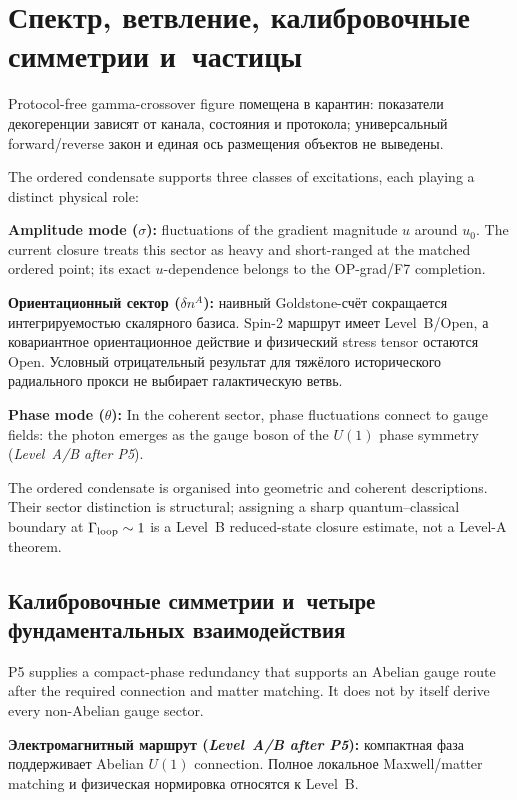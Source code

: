 \documentclass[11pt,a4paper]{article}
\begin{document}
\section{Спектр, ветвление, калибровочные симметрии и~частицы}
\label{sec:pop_spectrum_etc}

Protocol-free gamma-crossover figure помещена в карантин: показатели декогеренции зависят от канала, состояния и протокола; универсальный forward/reverse закон и единая ось размещения объектов не выведены.

The ordered condensate supports three classes of excitations, each playing a distinct physical role:

\textbf{Amplitude mode ($\sigma$):} fluctuations of the gradient magnitude $u$ around $u_0$.  The current closure treats this sector as heavy and short-ranged at the matched ordered point; its exact $u$-dependence belongs to the OP-grad/F7 completion.

\textbf{Ориентационный сектор ($\delta n^A$):} наивный Goldstone-счёт сокращается интегрируемостью скалярного базиса. Spin-2 маршрут имеет Level~B/Open, а ковариантное ориентационное действие и физический stress tensor остаются Open. Условный отрицательный результат для тяжёлого исторического радиального прокси не выбирает галактическую ветвь.

\textbf{Phase mode ($\theta$):} In the coherent sector, phase fluctuations connect to gauge fields: the photon emerges as the gauge boson of the $U(1)$ phase symmetry (\emph{Level~A/B after P5}).

The ordered condensate is organised into geometric and coherent descriptions.  Their sector distinction is structural; assigning a sharp quantum--classical boundary at $\Gamma_{\rm loop}\sim1$ is a Level~B reduced-state closure estimate, not a Level-A theorem.

\subsection{Калибровочные симметрии и~четыре фундаментальных взаимодействия}
\label{sec:pop_gauge}

P5 supplies a compact-phase redundancy that supports an Abelian gauge route after the required connection and matter matching. It does not by itself derive every non-Abelian gauge sector.

\textbf{Электромагнитный маршрут (\emph{Level~A/B after P5}):} компактная фаза поддерживает Abelian $U(1)$ connection. Полное локальное Maxwell/matter matching и физическая нормировка относятся к Level~B.
\end{document}
